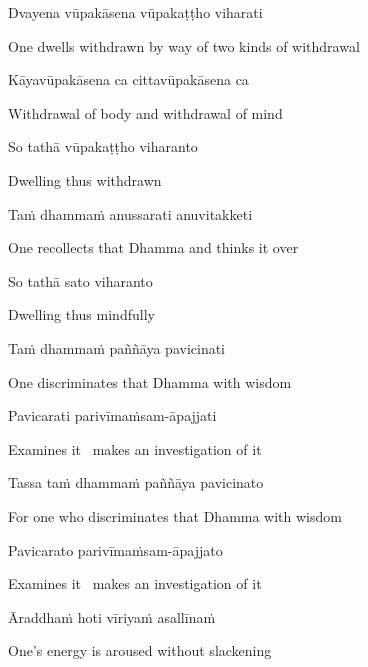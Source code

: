 Dvayena vūpakāsena vūpakaṭṭho viharati

\begin{cprenglish}
  One dwells withdrawn by way of two kinds of withdrawal
\end{cprenglish}

Kāyavūpakāsena ca cittavūpakāsena ca

\begin{cprenglish}
  Withdrawal of body and withdrawal of mind
\end{cprenglish}

So tathā vūpakaṭṭho viharanto

\begin{cprenglish}
  Dwelling thus withdrawn
\end{cprenglish}

Taṁ dhammaṁ anussarati anuvitakketi

\begin{cprenglish}
  One recollects that Dhamma and thinks it over
\end{cprenglish}

So tathā sato viharanto

\begin{cprenglish}
  Dwelling thus mindfully
\end{cprenglish}

Taṁ dhammaṁ paññāya pavicinati

\begin{cprenglish}
  One discriminates that Dhamma with wisdom
\end{cprenglish}

Pavicarati parivīmaṁsam-āpajjati

\begin{cprenglish}
  Examines it \breathmark\ makes an investigation of it
\end{cprenglish}

Tassa taṁ dhammaṁ paññāya pavicinato

\begin{cprenglish}
  For one who discriminates that Dhamma with wisdom
\end{cprenglish}

Pavicarato parivīmaṁsam-āpajjato

\begin{cprenglish}
  Examines it \breathmark\ makes an investigation of it
\end{cprenglish}

Āraddhaṁ hoti vīriyaṁ asallīnaṁ

\begin{cprenglish}
  One’s energy is aroused without slackening
\end{cprenglish}

